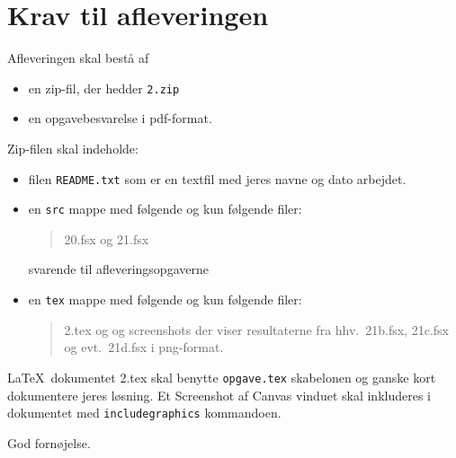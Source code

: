 \documentclass[a4paper,12pt]{article}
\newcommand{\exerciseNumber}{2}
\begin{document}
\section*{Krav til afleveringen}
Afleveringen skal bestå af
\begin{itemize}
  \item en zip-fil, der hedder \texttt{\exerciseNumber\typeLetter.zip}
  \item en opgavebesvarelse i pdf-format.
\end{itemize}
Zip-filen skal indeholde:
\begin{itemize}
\item filen \texttt{README.txt} som er en textfil med jeres navne og dato arbejdet.
\item en \texttt{src} mappe med følgende og kun
  følgende filer:
  \begin{quote}
    \exerciseNumber\typeLetter0.fsx og \exerciseNumber\typeLetter1.fsx
  \end{quote}
  svarende til afleveringsopgaverne
\item en \texttt{tex} mappe med følgende og kun følgende filer:
  \begin{quote}
    \exerciseNumber\typeLetter.tex og og screenshots der viser resultaterne fra hhv.\ \exerciseNumber\typeLetter1b.fsx, \exerciseNumber\typeLetter1c.fsx og evt.\  \exerciseNumber\typeLetter1d.fsx i png-format.
  \end{quote}
\end{itemize}
\LaTeX\ dokumentet \exerciseNumber\typeLetter.tex skal benytte \lstinline[language=console]{opgave.tex} skabelonen og ganske kort dokumentere jeres løsning. Et Screenshot af Canvas vinduet skal inkluderes i dokumentet med \texttt{includegraphics} kommandoen.

\flushright God fornøjelse.
\end{document}
